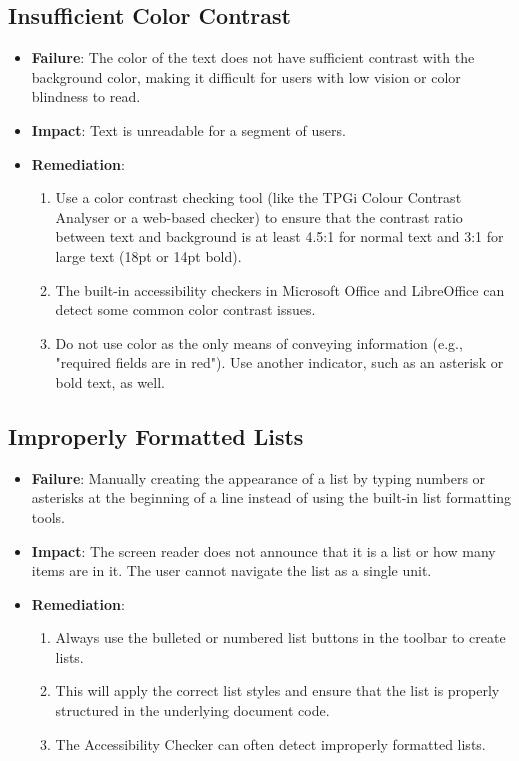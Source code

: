 \subsection{Insufficient Color Contrast}
\label{subsec:failures-color-contrast}
\begin{itemize}
	\item \textbf{Failure}: The color of the text does not have sufficient contrast with the background color, making it difficult for users with low vision or color blindness to read.
	\item \textbf{Impact}: Text is unreadable for a segment of users.
	\item \textbf{Remediation}:
	      \begin{enumerate}
		      \item Use a color contrast checking tool (like the TPGi Colour Contrast Analyser or a web-based checker) to ensure that the contrast ratio between text and background is at least 4.5:1 for normal text and 3:1 for large text (18pt or 14pt bold).
		      \item The built-in accessibility checkers in Microsoft Office and LibreOffice can detect some common color contrast issues.
		      \item Do not use color as the only means of conveying information (e.g., "required fields are in red"). Use another indicator, such as an asterisk or bold text, as well.
	      \end{enumerate}
\end{itemize}

\subsection{Improperly Formatted Lists}
\label{subsec:failures-lists}
\begin{itemize}
	\item \textbf{Failure}: Manually creating the appearance of a list by typing numbers or asterisks at the beginning of a line instead of using the built-in list formatting tools.
	\item \textbf{Impact}: The screen reader does not announce that it is a list or how many items are in it. The user cannot navigate the list as a single unit.
	\item \textbf{Remediation}:
	      \begin{enumerate}
		      \item Always use the bulleted or numbered list buttons in the toolbar to create lists.
		      \item This will apply the correct list styles and ensure that the list is properly structured in the underlying document code.
		      \item The Accessibility Checker can often detect improperly formatted lists.
	      \end{enumerate}
\end{itemize}


